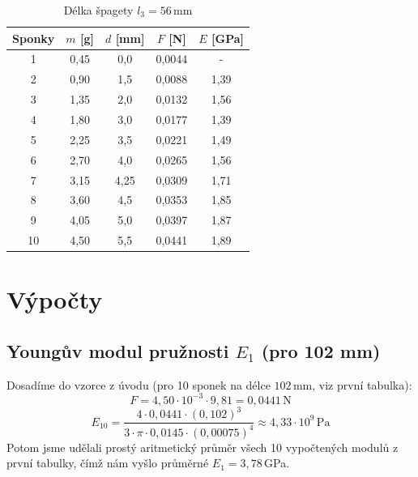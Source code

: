 \documentclass[a4paper,12pt]{article}
\begin{document}
\begin{table}[H]
\centering
\caption{Délka špagety $l_3 = 56$\,mm}
\vspace{2mm}
\renewcommand{\arraystretch}{1.5}
\begin{tabular}{|c|c|c|c|c|}
\hline
\textbf{Sponky} & \textbf{$m$ [g]} & \textbf{$d$ [mm]} & \textbf{$F$ [N]} & \textbf{$E$ [GPa]} \\
\hline \hline
1  & 0,45 & 0,0  & 0,0044 & {-} \\ \hline
2  & 0,90 & 1,5  & 0,0088 & 1,39 \\ \hline
3  & 1,35 & 2,0  & 0,0132 & 1,56 \\ \hline
4  & 1,80 & 3,0  & 0,0177 & 1,39 \\ \hline
5  & 2,25 & 3,5  & 0,0221 & 1,49 \\ \hline
6  & 2,70 & 4,0  & 0,0265 & 1,56 \\ \hline
7  & 3,15 & 4,25 & 0,0309 & 1,71 \\ \hline
8  & 3,60 & 4,5  & 0,0353 & 1,85 \\ \hline
9  & 4,05 & 5,0  & 0,0397 & 1,87 \\ \hline
10 & 4,50 & 5,5  & 0,0441 & 1,89 \\ \hline
\end{tabular}
\end{table}

\section{Výpočty}

\subsection{Youngův modul pružnosti $E_1$ (pro 102 mm)}
Dosadíme do vzorce z úvodu (pro 10 sponek na délce $102$\,mm, viz první tabulka):
$$ F = 4,50 \cdot 10^{-3} \cdot 9,81 = 0,0441\,\text{N} $$
$$ E_{10} = \frac{4 \cdot 0,0441 \cdot (0,102)^3}{3 \cdot \pi \cdot 0,0145 \cdot (0,00075)^4} \approx 4,33 \cdot 10^9\,\text{Pa} $$
Potom jsme udělali prostý aritmetický průměr všech 10 vypočtených modulů z první tabulky, čímž nám vyšlo průměrné $E_1 = 3,78$\,GPa.
\end{document}
